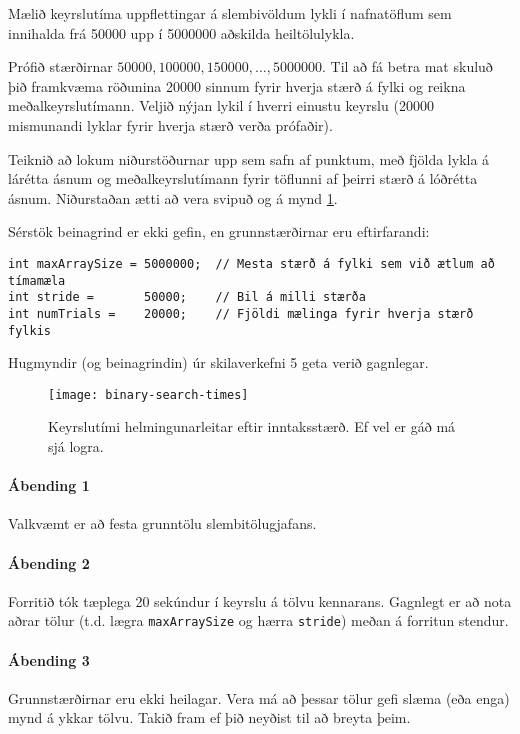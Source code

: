 \documentclass{article}
\begin{document}
Mælið keyrslutíma uppflettingar á slembivöldum lykli í nafnatöflum sem innihalda frá 50000 upp í 5000000 aðskilda heiltölulykla. 

Prófið stærðirnar $50000, 100000, 150000, \ldots , 5000000$. Til að fá betra mat skuluð þið framkvæma röðunina 20000 sinnum fyrir hverja stærð á fylki og reikna meðalkeyrslutímann. Veljið nýjan lykil í hverri einustu keyrslu (20000 mismunandi lyklar fyrir hverja stærð verða prófaðir).

Teiknið að lokum niðurstöðurnar upp sem safn af punktum, með fjölda lykla á lárétta ásnum og meðalkeyrslutímann fyrir töflunni af þeirri stærð á lóðrétta ásnum. Niðurstaðan ætti að vera svipuð og á mynd \ref{mynd:1}.

\newpage

Sérstök beinagrind er ekki gefin, en grunnstærðirnar eru eftirfarandi:

\begin{verbatim}
int maxArraySize = 5000000;  // Mesta stærð á fylki sem við ætlum að tímamæla
int stride =       50000;    // Bil á milli stærða
int numTrials =    20000;    // Fjöldi mælinga fyrir hverja stærð fylkis
\end{verbatim}

Hugmyndir (og beinagrindin) úr skilaverkefni 5 geta verið gagnlegar.

\begin{figure}[h]
	\caption{Keyrslutími helmingunarleitar eftir inntaksstærð. Ef vel er gáð má sjá logra.}
	\label{mynd:1}
	\begin{center}
		\texttt{[image: binary-search-times]}
	\end{center}
\end{figure}

\paragraph{Ábending 1} Valkvæmt er að festa grunntölu slembitölugjafans.
\paragraph{Ábending 2} Forritið tók tæplega 20 sekúndur í keyrslu á tölvu kennarans. Gagnlegt er að nota aðrar tölur (t.d. lægra \texttt{maxArraySize} og hærra \texttt{stride}) meðan á forritun stendur.
\paragraph{Ábending 3} Grunnstærðirnar eru ekki heilagar. Vera má að þessar tölur gefi slæma (eða enga) mynd á ykkar tölvu. Takið fram ef þið neyðist til að breyta þeim.
\end{document}
